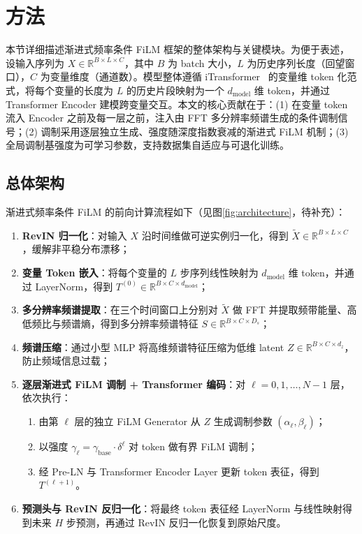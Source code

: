 \section{方法}
\label{sec:method}

本节详细描述渐进式频率条件 FiLM 框架的整体架构与关键模块。为便于表述，设输入序列为 \(X \in \mathbb{R}^{B \times L \times C}\)，其中 \(B\) 为 batch 大小，\(L\) 为历史序列长度（回望窗口），\(C\) 为变量维度（通道数）。模型整体遵循 iTransformer~\cite{itransformer} 的变量维 token 化范式，将每个变量的长度为 \(L\) 的历史片段映射为一个 \(d_{\text{model}}\) 维 token，并通过 Transformer Encoder 建模跨变量交互。本文的核心贡献在于：(1) 在变量 token 流入 Encoder 之前及每一层之前，注入由 FFT 多分辨率频谱生成的条件调制信号；(2) 调制采用逐层独立生成、强度随深度指数衰减的渐进式 FiLM 机制；(3) 全局调制基强度为可学习参数，支持数据集自适应与可退化训练。

\subsection{总体架构}
\label{subsec:overview}

渐进式频率条件 FiLM 的前向计算流程如下（见图\ref{fig:architecture}，待补充）：

\begin{enumerate}[leftmargin=*,label=\textbf{Step \arabic*:},itemsep=4pt]
  \item \textbf{RevIN 归一化}：对输入 \(X\) 沿时间维做可逆实例归一化，得到 \(\tilde{X} \in \mathbb{R}^{B \times L \times C}\)，缓解非平稳分布漂移；
  \item \textbf{变量 Token 嵌入}：将每个变量的 \(L\) 步序列线性映射为 \(d_{\text{model}}\) 维 token，并通过 LayerNorm，得到 \(T^{(0)} \in \mathbb{R}^{B \times C \times d_{\text{model}}}\)；
  \item \textbf{多分辨率频谱提取}：在三个时间窗口上分别对 \(\tilde{X}\) 做 FFT 并提取频带能量、高低频比与频谱熵，得到多分辨率频谱特征 \(S \in \mathbb{R}^{B \times C \times D_s}\)；
  \item \textbf{频谱压缩}：通过小型 MLP 将高维频谱特征压缩为低维 latent \(Z \in \mathbb{R}^{B \times C \times d_z}\)，防止频域信息过载；
  \item \textbf{逐层渐进式 FiLM 调制 + Transformer 编码}：对 \(\ell = 0, 1, \dots, N-1\) 层，依次执行：
  \begin{enumerate}
    \item 由第 \(\ell\) 层的独立 FiLM Generator 从 \(Z\) 生成调制参数 \((\alpha_\ell, \beta_\ell)\)；
    \item 以强度 \(\gamma_\ell = \gamma_{\text{base}} \cdot \delta^{\ell}\) 对 token 做有界 FiLM 调制；
    \item 经 Pre-LN 与 Transformer Encoder Layer 更新 token 表征，得到 \(T^{(\ell+1)}\)。
  \end{enumerate}
  \item \textbf{预测头与 RevIN 反归一化}：将最终 token 表征经 LayerNorm 与线性映射得到未来 \(H\) 步预测，再通过 RevIN 反归一化恢复到原始尺度。
\end{enumerate}

